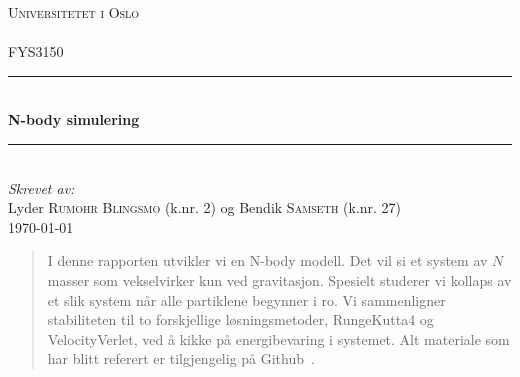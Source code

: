 \documentclass[11pt]{article}
\begin{document}
\begin{titlepage}
  \newcommand{\HRule}{\rule{\linewidth}{0.5mm}}
  \center
  \textsc{\LARGE Universitetet i Oslo}\\[1.5cm] %
  \textsc{\Large }\\[0.5cm] %
  \textsc{\large FYS3150}\\[0.5cm] %
  \HRule \\[0.4cm]
  { \huge \bfseries N-body simulering}\\[0.4cm]
  \HRule \\[1.5cm]
  \Large \emph{Skrevet av:}\\
  Lyder \textsc{Rumohr Blingsmo} (k.nr. 2) og Bendik \textsc{Samseth} (k.nr. 27)\\[3cm]
  {\large \today}\\[3cm]
  \vfill
\end{titlepage}

\tableofcontents
\begin{abstract}
I denne rapporten utvikler vi en N-body modell. Det vil si et system av
$N$ masser som vekselvirker kun ved gravitasjon. Spesielt studerer vi kollaps
av et slik system når alle partiklene begynner i ro. Vi sammenligner 
stabiliteten til to forskjellige løsningsmetoder, RungeKutta4 og VelocityVerlet,
ved å kikke på energibevaring i systemet. 
Alt materiale som har blitt referert er tilgjengelig
 på Github~\cite{github-repo}. 
\end{abstract}
\end{document}
